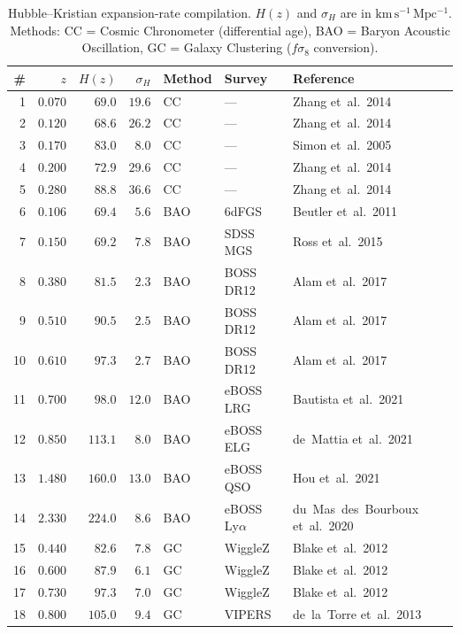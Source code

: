 \begin{table}[htbp]
\centering
\caption{Hubble--Kristian expansion-rate compilation. $H(z)$ and $\sigma_H$ are in $\mathrm{km\,s^{-1}\,Mpc^{-1}}$. Methods: CC = Cosmic Chronometer (differential age), BAO = Baryon Acoustic Oscillation, GC = Galaxy Clustering ($f\sigma_8$ conversion).}
\label{tab:hk-dataset}
\small
\begin{tabular}{r r r r l l l}
\hline
\# & $z$ & $H(z)$ & $\sigma_H$ & Method & Survey & Reference \\
\hline
1  & $0.070$ & $69.0$  & $19.6$ & CC  & ---        & Zhang et~al.\ 2014 \\
2  & $0.120$ & $68.6$  & $26.2$ & CC  & ---        & Zhang et~al.\ 2014 \\
3  & $0.170$ & $83.0$  & $8.0$  & CC  & ---        & Simon et~al.\ 2005 \\
4  & $0.200$ & $72.9$  & $29.6$ & CC  & ---        & Zhang et~al.\ 2014 \\
5  & $0.280$ & $88.8$  & $36.6$ & CC  & ---        & Zhang et~al.\ 2014 \\
6  & $0.106$ & $69.4$  & $5.6$  & BAO & 6dFGS      & Beutler et~al.\ 2011 \\
7  & $0.150$ & $69.2$  & $7.8$  & BAO & SDSS MGS   & Ross et~al.\ 2015 \\
8  & $0.380$ & $81.5$  & $2.3$  & BAO & BOSS DR12  & Alam et~al.\ 2017 \\
9  & $0.510$ & $90.5$  & $2.5$  & BAO & BOSS DR12  & Alam et~al.\ 2017 \\
10 & $0.610$ & $97.3$  & $2.7$  & BAO & BOSS DR12  & Alam et~al.\ 2017 \\
11 & $0.700$ & $98.0$  & $12.0$ & BAO & eBOSS LRG  & Bautista et~al.\ 2021 \\
12 & $0.850$ & $113.1$ & $8.0$  & BAO & eBOSS ELG  & de~Mattia et~al.\ 2021 \\
13 & $1.480$ & $160.0$ & $13.0$ & BAO & eBOSS QSO  & Hou et~al.\ 2021 \\
14 & $2.330$ & $224.0$ & $8.6$  & BAO & eBOSS Ly$\alpha$ & du~Mas~des~Bourboux et~al.\ 2020 \\
15 & $0.440$ & $82.6$  & $7.8$  & GC  & WiggleZ    & Blake et~al.\ 2012 \\
16 & $0.600$ & $87.9$  & $6.1$  & GC  & WiggleZ    & Blake et~al.\ 2012 \\
17 & $0.730$ & $97.3$  & $7.0$  & GC  & WiggleZ    & Blake et~al.\ 2012 \\
18 & $0.800$ & $105.0$ & $9.4$  & GC  & VIPERS     & de~la~Torre et~al.\ 2013 \\
\hline
\end{tabular}
\end{table}

